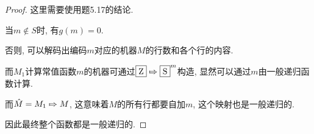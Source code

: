 \begin{proof}
	这里需要使用题5.17的结论.
	
	当$m\notin S$时, 有$g(m)=0$.
	
	否则, 可以解码出编码$m$对应的机器$M$的行数和各个行的内容.
	
	而$M_1$计算常值函数$m$的机器可通过$\machine{Z}\concat \machine{S}^m$构造, 显然可以通过$m$由一般递归函数计算.
	
	而$\hat{M}=M_1\concat M$, 这意味着$M$的所有行都要自加$m$, 这个映射也是一般递归的.
	
	因此最终整个函数都是一般递归的.
\end{proof}
